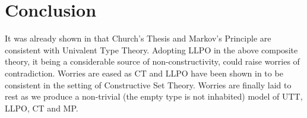 \documentclass[12pt]{report}
\theoremstyle{definition}
\begin{document}

\chapter{Conclusion}
It was already shown in \cite{1905.03014} that Church's Thesis and Markov's Principle are consistent with Univalent Type Theory. 
Adopting LLPO in the above composite theory, it being a considerable source of non-constructivity, could raise worries of contradiction. 
Worries are eased as CT and LLPO have been shown in \cite{rathjen2018lifschitz} to be consistent in the setting of Constructive Set Theory. 
Worries are finally laid to rest as we produce a non-trivial (the empty type is not inhabited) model of UTT, LLPO, CT and MP. 
\end{document}
